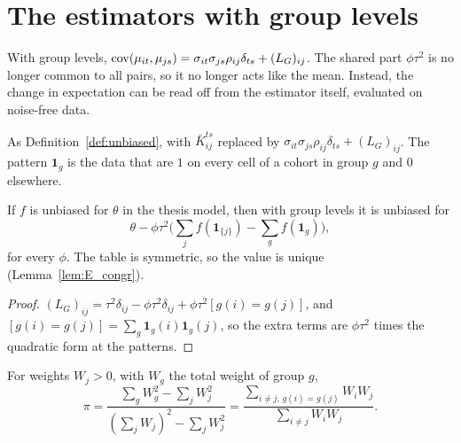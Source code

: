 \section{The estimators with group levels}\label{sec:hier_bridge5}

With group levels, $\operatorname{cov}(\mu_{it},\mu_{js}) =
\sigma_{it}\sigma_{js}\rho_{ij}\delta_{ts} + (L_G)_{ij}$. The shared part
$\phi\tau^2$ is no longer common to all pairs, so it no longer acts like the
mean. Instead, the change in expectation can be read off from the estimator
itself, evaluated on noise-free data.

\begin{definition}\label{def:EG}
  \leanok
  As Definition~\ref{def:unbiased}, with $\bar K^{ts}_{ij}$ replaced by
  $\sigma_{it}\sigma_{js}\rho_{ij}\delta_{ts} + (L_G)_{ij}$. The pattern
  $\mathbf 1_g$ is the data that are $1$ on every cell of a cohort in group
  $g$ and $0$ elsewhere.
\end{definition}

\begin{theorem}\label{thm:unbiasedG_of}
  \leanok
  If $f$ is unbiased for $\theta$ in the thesis model, then with group levels
  it is unbiased for
  \[
    \theta - \phi\tau^2\Big(\sum_j f(\mathbf 1_{\{j\}}) - \sum_g f(\mathbf 1_g)\Big),
  \]
  for every $\phi$. The table is symmetric, so the value is unique
  (Lemma~\ref{lem:E_congr}).
\end{theorem}
\begin{proof}
  \leanok
  $(L_G)_{ij} = \tau^2\delta_{ij} - \phi\tau^2\delta_{ij} + \phi\tau^2[g(i) = g(j)]$,
  and $[g(i) = g(j)] = \sum_g \mathbf 1_g(i)\mathbf 1_g(j)$, so the extra
  terms are $\phi\tau^2$ times the quadratic form at the patterns.
\end{proof}

\begin{definition}\label{def:withinShare}
  \leanok
  For weights $W_j > 0$, with $W_g$ the total weight of group $g$,
  \[
    \pi = \frac{\sum_g W_g^2 - \sum_j W_j^2}{(\sum_j W_j)^2 - \sum_j W_j^2}
        = \frac{\sum_{i \ne j,\, g(i) = g(j)} W_iW_j}{\sum_{i \ne j} W_iW_j}.
  \]
\end{definition}

